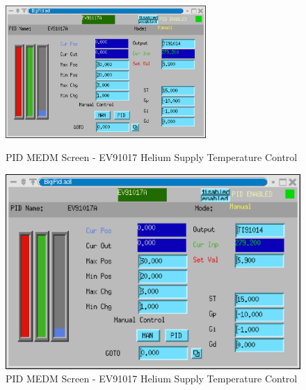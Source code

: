 \begin{figure}[h!]
\begin{latexonly}
\centering
\includegraphics[width=3in]{ev91017a.eps}
\caption{PID MEDM Screen - EV91017 Helium Supply Temperature Control}
\label{fig:ev17stc}
\end{latexonly}
\begin{htmlonly}
\includegraphics{ev91017a.eps}
\caption{PID MEDM Screen - EV91017 Helium Supply Temperature Control}
\label{fig:ev17stc}
\end{htmlonly}
\end{figure}




